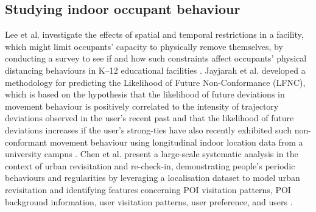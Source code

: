 \documentclass[acmtog]{acmart}
\begin{document}
\subsection{Studying indoor occupant behaviour}
Lee et al. investigate the effects of spatial and temporal restrictions in a facility, which might limit occupants' capacity to physically remove themselves, by conducting a survey to see if and how such constraints affect occupants' physical distancing behaviours in K–12 educational facilities \cite{lee2022understanding}. Jayjarah et al. developed a methodology for predicting the Likelihood of Future Non-Conformance (LFNC), which is based on the hypothesis that the likelihood of future deviations in movement behaviour is positively correlated to the intensity of trajectory deviations observed in the user's recent past and that the likelihood of future deviations increases if the user's strong-ties have also recently exhibited such non-conformant movement behaviour using longitudinal indoor location data from a university campus \cite{jayarajah2018predicting}. Chen et al. present a large-scale systematic analysis in the context of urban revisitation and re-check-in, demonstrating people's periodic behaviours and regularities by leveraging a localisation dataset to model urban revisitation and identifying features concerning POI visitation patterns, POI background information, user visitation patterns, user preference, and users \cite{chen2020will}.
\end{document}
